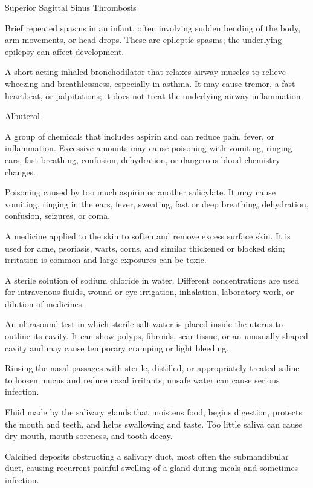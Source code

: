 \synonyms
Superior Sagittal Sinus Thrombosis

 Brief repeated spasms in an infant, often involving sudden bending of the body, arm movements, or head drops. These are epileptic spasms; the underlying epilepsy can affect development.

 A short-acting inhaled bronchodilator that relaxes airway muscles to relieve wheezing and breathlessness, especially in asthma. It may cause tremor, a fast heartbeat, or palpitations; it does not treat the underlying airway inflammation.

\synonyms
Albuterol

 A group of chemicals that includes aspirin and can reduce pain, fever, or inflammation. Excessive amounts may cause poisoning with vomiting, ringing ears, fast breathing, confusion, dehydration, or dangerous blood chemistry changes.

 Poisoning caused by too much aspirin or another salicylate. It may cause vomiting, ringing in the ears, fever, sweating, fast or deep breathing, dehydration, confusion, seizures, or coma.

 A medicine applied to the skin to soften and remove excess surface skin. It is used for acne, psoriasis, warts, corns, and similar thickened or blocked skin; irritation is common and large exposures can be toxic.

 A sterile solution of sodium chloride in water. Different concentrations are used for intravenous fluids, wound or eye irrigation, inhalation, laboratory work, or dilution of medicines.

 An ultrasound test in which sterile salt water is placed inside the uterus to outline its cavity. It can show polyps, fibroids, scar tissue, or an unusually shaped cavity and may cause temporary cramping or light bleeding.

 Rinsing the nasal passages with sterile, distilled, or appropriately treated saline to loosen mucus and reduce nasal irritants; unsafe water can cause serious infection.

 Fluid made by the salivary glands that moistens food, begins digestion, protects the mouth and teeth, and helps swallowing and taste. Too little saliva can cause dry mouth, mouth soreness, and tooth decay.

 Calcified deposits obstructing a salivary duct, most often the submandibular duct, causing recurrent painful swelling of a gland during meals and sometimes infection.

